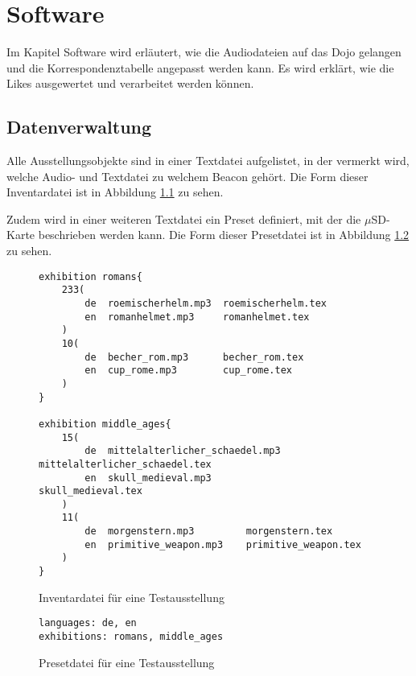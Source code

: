 \chapter{Software}
\label{Software}
\thispagestyle{fancy} 
Im Kapitel Software wird erläutert, wie die Audiodateien auf das Dojo gelangen und die Korrespondenztabelle angepasst werden kann. Es wird erklärt, wie die Likes ausgewertet und verarbeitet werden können.


\section{Datenverwaltung}
Alle Ausstellungsobjekte sind in einer Textdatei aufgelistet, in der vermerkt wird, welche Audio- und Textdatei zu welchem Beacon gehört.
Die Form dieser Inventardatei ist in Abbildung \ref{inventory_syntax} zu sehen.

Zudem wird in einer weiteren Textdatei ein Preset definiert, mit der die $\mu$SD-Karte beschrieben werden kann.
Die Form dieser Presetdatei ist in Abbildung \ref{preset_syntax} zu sehen.

\begin{figure}[h]
	\begin{verbatim}
exhibition romans{
    233(
        de  roemischerhelm.mp3  roemischerhelm.tex
        en  romanhelmet.mp3     romanhelmet.tex
    )
    10(
        de  becher_rom.mp3      becher_rom.tex
        en  cup_rome.mp3        cup_rome.tex
    )
}

exhibition middle_ages{
    15(
        de  mittelalterlicher_schaedel.mp3  mittelalterlicher_schaedel.tex
        en  skull_medieval.mp3              skull_medieval.tex
    )
    11(
        de  morgenstern.mp3         morgenstern.tex
        en  primitive_weapon.mp3    primitive_weapon.tex
    )
}
	\end{verbatim}
	\caption{Inventardatei für eine Testausstellung}
	\label{inventory_syntax}
\end{figure}

\begin{figure}[h]
	\begin{verbatim}
languages: de, en
exhibitions: romans, middle_ages
	\end{verbatim}
	\caption{Presetdatei für eine Testausstellung}
	\label{preset_syntax}
\end{figure}

